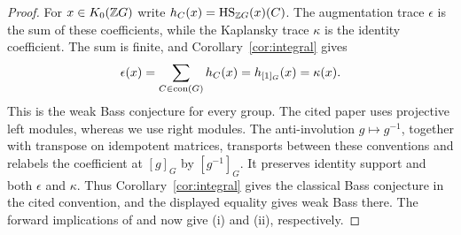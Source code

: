 \begin{proof}
For $x\in K_0(\mathbb Z G)$ write $h_C(x)=\operatorname{HS}_{\mathbb Z G}(x)(C)$. The
augmentation trace $\epsilon$ is the sum of these coefficients, while
the Kaplansky trace $\kappa$ is the identity coefficient. The sum is
finite, and Corollary~\ref{cor:integral} gives
\[
 \epsilon(x)=\sum_{C\in\operatorname{con}(G)}h_C(x)=h_{[1]_G}(x)=\kappa(x).
\]
This is the weak Bass conjecture for every group. The cited paper uses
projective left modules, whereas we use right modules. The anti-involution
$g\mapsto g^{-1}$, together with transpose on idempotent matrices,
transports between these conventions and relabels the coefficient at
$[g]_G$ by $[g^{-1}]_G$. It preserves identity support and both
$\epsilon$ and $\kappa$. Thus Corollary~\ref{cor:integral} gives the
classical Bass conjecture in the cited convention, and the displayed
equality gives weak Bass there. The forward implications of
\cite[Theorem 1]{BCM2006} and \cite[Theorem 2]{BCM2006} now give
\textup{(i)} and \textup{(ii)}, respectively.
\end{proof}
